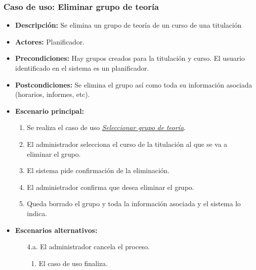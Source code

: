 \subsubsection*{Caso de uso: Eliminar grupo de teoría}
\begin{itemize}
\item{\bf Descripción:} Se elimina un grupo de teoría de un curso de una titulación
\item{\bf Actores:} Planificador.
\item{\bf Precondiciones:} Hay grupos creados para la titulación y curso. El usuario identificado en el sistema es un planificador.
\item{\bf Postcondiciones:} Se elimina el grupo así como toda su información asociada (horarios, informes, etc).
\item{\bf Escenario principal:}
	\begin{enumerate}
	\item Se realiza el caso de uso {\em \hyperref[select_grupo]{Seleccionar grupo de teoría}}.
	\item El administrador selecciona el curso de la titulación al que se va a eliminar el grupo.
	\item El sistema pide confirmación de la eliminación.
	\item El administrador confirma que desea eliminar el grupo.
	\item Queda borrado el grupo y toda la información asociada y el sistema lo indica.
	\end{enumerate}
\item{\bf Escenarios alternativos:}
	\begin{itemize}
		\item[4.a.] El administrador cancela el proceso.
		\begin{enumerate}
			\item El caso de uso finaliza.
		\end{enumerate}
	\end{itemize}
\end{itemize}



